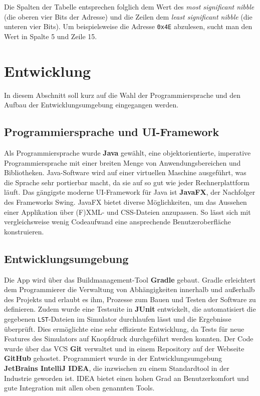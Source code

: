 \documentclass[a4paper]{article}
\begin{document}
Die Spalten der Tabelle entsprechen folglich dem Wert des \textit{most significant nibble} (die oberen vier Bits der Adresse) und die Zeilen dem \textit{least significant nibble} (die unteren vier Bits).
Um beispielsweise die Adresse \texttt{0x4E} abzulesen, sucht man den Wert in Spalte 5 und Zeile 15.

\section{Entwicklung}

In diesem Abschnitt soll kurz auf die Wahl der Programmiersprache und den Aufbau der Entwicklungsumgebung eingegangen werden.

\subsection{Programmiersprache und UI-Framework}

Als Programmiersprache wurde \textbf{Java} gewählt, eine objektorientierte, imperative Programmiersprache mit einer breiten Menge von Anwendungsbereichen und Bibliotheken.
Java-Software wird auf einer virtuellen Maschine ausgeführt, was die Sprache sehr portierbar macht, da sie auf so gut wie jeder Rechnerplattform läuft.
Das gängigste moderne UI-Framework für Java ist \textbf{JavaFX}, der Nachfolger des Frameworks Swing.
JavaFX bietet diverse Möglichkeiten, um das Aussehen einer Applikation über (F)XML- und CSS-Dateien anzupassen.
So lässt sich mit vergleichsweise wenig Codeaufwand eine ansprechende Benutzeroberfläche konstruieren.

\subsection{Entwicklungsumgebung}

Die App wird über das Buildmanagement-Tool \textbf{Gradle} gebaut.
Gradle erleichtert dem Programmierer die Verwaltung von Abhängigkeiten innerhalb und außerhalb des Projekts und erlaubt es ihm, Prozesse zum Bauen und Testen der Software zu definieren.
Zudem wurde eine Testsuite in \textbf{JUnit} entwickelt, die automatisiert die gegebenen \texttt{LST}-Dateien im Simulator durchlaufen lässt und die Ergebnisse überprüft.
Dies ermöglichte eine sehr effiziente Entwicklung, da Tests für neue Features des Simulators auf Knopfdruck durchgeführt werden konnten.
Der Code wurde über das VCS \textbf{Git} verwaltet und in einem Repository auf der Webseite \textbf{GitHub} gehostet.
Programmiert wurde in der Entwicklungsumgebung \textbf{JetBrains IntelliJ IDEA}, die inzwischen zu einem Standardtool in der Industrie geworden ist.
IDEA bietet einen hohen Grad an Benutzerkomfort und gute Integration mit allen oben genannten Tools.
\end{document}
